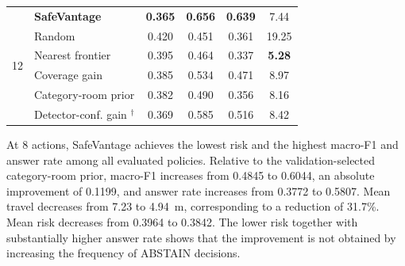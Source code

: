 \documentclass[letterpaper, 10 pt, conference]{ieeeconf}
\newcommand{\method}{SafeVantage}
\begin{document}
\begin{table}[t]
{\begin{tabular}{@{}clcccc@{}}
    \multirow[c]{6}{*}{12}
    & \textbf{SafeVantage}
    & \textbf{0.365}
    & \textbf{0.656}
    & \textbf{0.639}
    & 7.44 \\

    & Random
    & 0.420
    & 0.451
    & 0.361
    & 19.25 \\

    & Nearest frontier
    & 0.395
    & 0.464
    & 0.337
    & \textbf{5.28} \\
    
    & Coverage gain
    & 0.385
    & 0.534
    & 0.471
    & 8.97 \\
    
    & Category-room prior
    & 0.382
    & 0.490
    & 0.356
    & 8.16 \\

    & Detector-conf. gain $^{\dagger}$
    & 0.369
    & 0.585
    & 0.516
    & 8.42 \\
    
    \bottomrule
    \end{tabular}%
    }
    
    \end{table}
%
    At 8 actions, \method{} achieves the lowest risk and the highest macro-F1 and answer rate among all evaluated policies. Relative to the validation-selected category-room prior, macro-F1 increases from 0.4845 to 0.6044, an absolute improvement of 0.1199, and answer rate increases from 0.3772 to 0.5807. Mean travel decreases from 7.23 to 4.94~m, corresponding to a reduction of 31.7\%. Mean risk decreases from 0.3964 to 0.3842. The lower risk together with substantially higher answer rate shows that the improvement is not obtained by increasing the frequency of \textsc{ABSTAIN} decisions.
\end{document}
